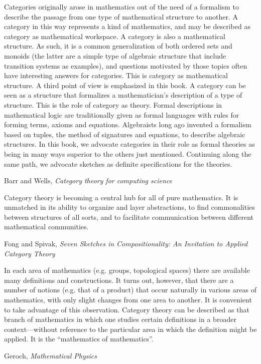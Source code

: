 \documentclass[11pt,openany]{article}
\begin{document}
\epigraph{Categories originally arose in mathematics out of the need of a formalism to
describe the passage from one type of mathematical structure to another. A
category in this way represents a kind of mathematics, and may be described
as category as mathematical workspace.
A category is also a mathematical structure. As such, it is a common
generalization of both ordered sets and monoids (the latter are a simple
type of algebraic structure that include transition systems as examples),
and questions motivated by those topics often have interesting answers for
categories. This is category as mathematical structure.
A third point of view is emphasized in this book. A category can be seen
as a structure that formalizes a mathematician's description of a type of
structure. This is the role of category as theory. Formal descriptions in
mathematical logic are traditionally given as formal languages with rules for
forming terms, axioms and equations. Algebraists long ago invented a formalism
based on tuples, the method of signatures and equations, to describe
algebraic structures. In this book, we advocate categories in their role as formal
theories as being in many ways superior to the others just mentioned.
Continuing along the same path, we advocate sketches as definite specifications
for the theories.}
{Barr and Wells, \textit{Category theory for computing science}~\cite{barr-wells-2020}}

\epigraph{Category theory is becoming a central hub for all of pure mathematics. It is unmatched
in its ability to organize and layer abstractions, to find commonalities between structures
of all sorts, and to facilitate communication between different mathematical
communities.}
{Fong and Spivak, \textit{Seven Sketches in Compositionality: 
An Invitation to Applied Category Theory}~\cite{fong-spivakd2018-seven-sketches}}

\pagebreak
\epigraph{In each area of mathematics 
(e.g. groups, topological spaces) 
there are available many definitions and constructions.
It turns out, however, that there are a number of notions
(e.g. that of a product) that occur naturally 
in various areas of mathematics, with only slight changes from
one area to another.
It is convenient to take advantage of this observation.
Category theory can be described as that branch of mathematics
in which one studies certain definitions in a broader context---without
reference to the particular area 
in which the definition might be applied.
It is the ``mathematics of mathematics''.}
{Geroch, \textit{Mathematical Physics}~\cite{geroch-1985}}
\end{document}
